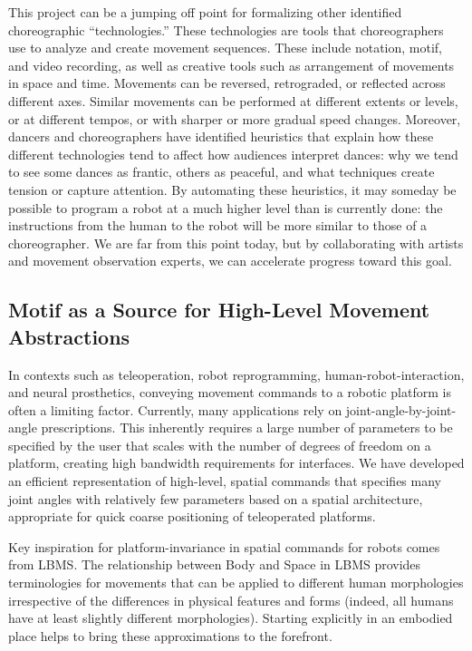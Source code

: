 \documentclass[arts,article,submit,moreauthors,pdftex,10pt,a4paper]{mdpi}
\begin{document}
This project can be a jumping off point for formalizing other identified
choreographic ``technologies.'' These technologies are tools that
choreographers use to analyze and create movement sequences. These include
notation, motif, and video recording, as well as creative tools such as
arrangement of movements in space and time. Movements can be reversed,
retrograded, or reflected across different axes. Similar movements can be
performed at different extents or levels, or at different tempos, or with
sharper or more gradual speed changes. Moreover, dancers and choreographers have
identified heuristics that explain how these different technologies tend to
affect how audiences interpret dances: why we tend to see some dances as
frantic, others as peaceful, and what techniques create tension or capture
attention. By automating these heuristics, it may someday be possible to program
a robot at a much higher level than is currently done: the instructions from the
human to the robot will be more similar to those of a choreographer. We are far
from this point today, but by collaborating with artists and movement
observation experts, we can accelerate progress toward this goal.

\subsection{Motif as a Source for High-Level Movement Abstractions}
In contexts such as teleoperation, robot reprogramming, human-robot-interaction, and neural prosthetics, conveying movement commands to a robotic platform is often a limiting factor. Currently, many applications rely on joint-angle-by-joint-angle prescriptions.  This inherently requires a large number of parameters to be specified by the user that scales with the  number of degrees of freedom on a platform, creating high bandwidth requirements for interfaces.  We have developed an efficient representation of high-level, spatial commands that specifies many joint angles with relatively few parameters based on a spatial architecture, appropriate for quick coarse positioning of teleoperated platforms.%

Key inspiration for platform-invariance in spatial commands for robots comes from LBMS. The relationship between Body and Space in LBMS provides terminologies for movements that can be applied to different human morphologies irrespective of the differences in physical features and forms (indeed, all humans have at least slightly different morphologies).   Starting explicitly in an embodied place helps to bring these approximations to the forefront.
\end{document}
